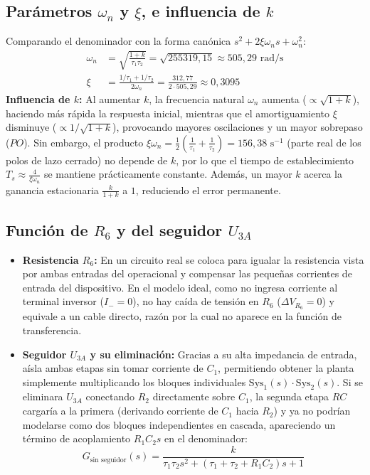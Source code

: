 \documentclass[11pt,a4paper]{article}
\begin{document}
\subsection{Parámetros $\omega_n$ y $\xi$, e influencia de $k$}
Comparando el denominador con la forma canónica $s^2 + 2\xi\omega_n s + \omega_n^2$:
\begin{align}
    \omega_n &= \sqrt{\frac{1+k}{\tau_1 \tau_2}} = \sqrt{255319,15} \approx 505,29\text{ rad/s} \\
    \xi &= \frac{1/\tau_1 + 1/\tau_2}{2\omega_n} = \frac{312,77}{2 \cdot 505,29} \approx 0,3095
\end{align}
\textbf{Influencia de $k$:} Al aumentar $k$, la frecuencia natural $\omega_n$ aumenta ($\propto \sqrt{1+k}$), haciendo más rápida la respuesta inicial, mientras que el amortiguamiento $\xi$ disminuye ($\propto 1/\sqrt{1+k}$), provocando mayores oscilaciones y un mayor sobrepaso ($PO$). Sin embargo, el producto $\xi\omega_n = \frac{1}{2}\left(\frac{1}{\tau_1} + \frac{1}{\tau_2}\right) = 156,38\text{ s}^{-1}$ (parte real de los polos de lazo cerrado) no depende de $k$, por lo que el tiempo de establecimiento $T_s \approx \frac{4}{\xi\omega_n}$ se mantiene prácticamente constante. Además, un mayor $k$ acerca la ganancia estacionaria $\frac{k}{1+k}$ a $1$, reduciendo el error permanente.

\subsection{Función de $R_6$ y del seguidor $U_{3A}$}
\begin{itemize}
    \item \textbf{Resistencia $R_6$:} En un circuito real se coloca para igualar la resistencia vista por ambas entradas del operacional y compensar las pequeñas corrientes de entrada del dispositivo. En el modelo ideal, como no ingresa corriente al terminal inversor ($I_- = 0$), no hay caída de tensión en $R_6$ ($\Delta V_{R_6} = 0$) y equivale a un cable directo, razón por la cual no aparece en la función de transferencia.
    \item \textbf{Seguidor $U_{3A}$ y su eliminación:} Gracias a su alta impedancia de entrada, aísla ambas etapas sin tomar corriente de $C_1$, permitiendo obtener la planta simplemente multiplicando los bloques individuales $\text{Sys}_1(s) \cdot \text{Sys}_2(s)$. Si se eliminara $U_{3A}$ conectando $R_2$ directamente sobre $C_1$, la segunda etapa $RC$ cargaría a la primera (derivando corriente de $C_1$ hacia $R_2$) y ya no podrían modelarse como dos bloques independientes en cascada, apareciendo un término de acoplamiento $R_1 C_2 s$ en el denominador:
    \begin{equation}
        G_{\text{sin seguidor}}(s) = \frac{k}{\tau_1 \tau_2 s^2 + (\tau_1 + \tau_2 + R_1 C_2)s + 1}
    \end{equation}
\end{itemize}
\end{document}
